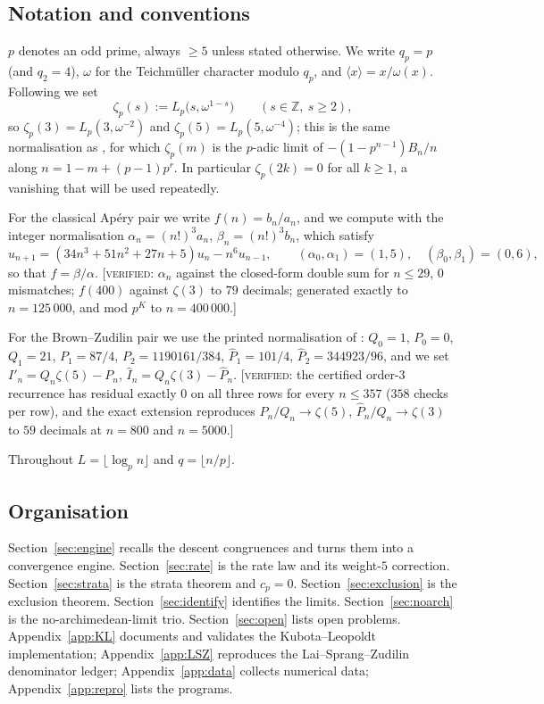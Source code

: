 \documentclass[11pt,reqno]{article}
\newcommand{\ZZ}{\mathbb{Z}}
\newcommand{\Ph}{\widehat{P}}
\newcommand{\Ih}{\widehat{I}}
\newcommand{\Ip}{I'}
\newcommand{\floor}[1]{\lfloor #1 \rfloor}
\newcommand{\VER}[1]{{\normalfont\textsc{[verified:} #1\textsc{]}}}
\theoremstyle{plain}
\theoremstyle{definition}
\theoremstyle{remark}
\numberwithin{equation}{section}
\begin{document}
\subsection{Notation and conventions}\label{ss:notation}

$p$ denotes an odd prime, always $\ge5$ unless stated otherwise.  We write
$q_p=p$ (and $q_2=4$), $\omega$ for the Teichm\"uller character modulo $q_p$,
and $\langle x\rangle=x/\omega(x)$.  Following \cite[Def.~8]{LSZ2025} we set
\[
  \zeta_p(s):=L_p\bigl(s,\omega^{1-s}\bigr)\qquad(s\in\ZZ,\ s\ge2),
\]
so $\zeta_p(3)=L_p(3,\omega^{-2})$ and $\zeta_p(5)=L_p(5,\omega^{-4})$; this is
the same normalisation as \cite{BV2025}, for which $\zeta_p(m)$ is the $p$-adic
limit of $-(1-p^{n-1})B_n/n$ along $n=1-m+(p-1)p^r$.  In particular
$\zeta_p(2k)=0$ for all $k\ge1$, a vanishing that will be used repeatedly.

For the classical Ap\'ery pair we write $f(n)=b_n/a_n$, and we compute with the
integer normalisation $\alpha_n=(n!)^3a_n$, $\beta_n=(n!)^3b_n$, which satisfy
\begin{equation}\label{eq:int-rec}
  u_{n+1}=(34n^3+51n^2+27n+5)u_n-n^6u_{n-1},\qquad
  (\alpha_0,\alpha_1)=(1,5),\quad(\beta_0,\beta_1)=(0,6),
\end{equation}
so that $f=\beta/\alpha$.  \VER{$\alpha_n$ against the closed-form double sum for
$n\le29$, $0$ mismatches; $f(400)$ against $\zeta(3)$ to $79$ decimals;
generated exactly to $n=125\,000$, and mod $p^K$ to $n=400\,000$.}

For the Brown--Zudilin pair we use the printed normalisation of
\cite{BrownZudilin2022}: $Q_0=1$, $P_0=0$, $Q_1=21$, $P_1=87/4$,
$P_2=1190161/384$, $\Ph_1=101/4$, $\Ph_2=344923/96$, and we set
$\Ip_n=Q_n\zeta(5)-P_n$, $\Ih_n=Q_n\zeta(3)-\Ph_n$.  \VER{the certified order-$3$
recurrence has residual exactly $0$ on all three rows for every $n\le357$
($358$ checks per row), and the exact extension reproduces
$P_n/Q_n\to\zeta(5)$, $\Ph_n/Q_n\to\zeta(3)$ to $59$ decimals at $n=800$ and
$n=5000$.}

Throughout $L=\floor{\log_p n}$ and $q=\floor{n/p}$.

\subsection{Organisation}
Section~\ref{sec:engine} recalls the descent congruences and turns them into a
convergence engine.  Section~\ref{sec:rate} is the rate law and its weight-$5$
correction.  Section~\ref{sec:strata} is the strata theorem and $c_p=0$.
Section~\ref{sec:exclusion} is the exclusion theorem.
Section~\ref{sec:identify} identifies the limits.  Section~\ref{sec:noarch} is
the no-archimedean-limit trio.  Section~\ref{sec:open} lists open problems.
Appendix~\ref{app:KL} documents and validates the Kubota--Leopoldt
implementation; Appendix~\ref{app:LSZ} reproduces the Lai--Sprang--Zudilin
denominator ledger; Appendix~\ref{app:data} collects numerical data;
Appendix~\ref{app:repro} lists the programs.
\end{document}
